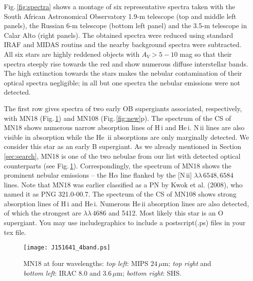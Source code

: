 \documentclass[useAMS]{mn2e}
\begin{document}
Fig.\,\ref{fig:spectra} shows a montage of six representative
spectra taken with the South African Astronomical Observatory 1.9-m
telescope (top and middle left panels), the Russian 6-m telescope
(bottom left panel) and the 3.5-m telescope in Calar Alto (right
panels). The obtained spectra were reduced using standard IRAF and
MIDAS routins and the nearby background spectra were subtracted. All
six stars are highly reddened objects with $A_V > 5-10$ mag so that
their spectra steeply rise towards the red and show numerous diffuse
interstellar bands. The high extinction towards the stars makes the
nebular contamination of their optical spectra negligible; in all
but one spectra the nebular emissions were not detected.

The first row gives spectra of two early OB supergiants associated,
respectively, with MN18 (Fig.\,\ref{fig:J151641(4band)}) and MN108
(Fig.\,\ref{fig:new}p). The spectrum of the CS of MN18 shows
numerous narrow absorption lines of H\,{\sc i} and He\,{\sc i}.
N\,{\sc ii} lines are also visible in absorption while the He\,{\sc
ii} absorptions are only marginally detected. We consider this star
as an early B supergiant. As we already mentioned in
Section\,\ref{sec:search}, MN18 is one of the two nebulae from our
list with detected optical counterparts (see
Fig.\,\ref{fig:J151641(4band)}). Correspondingly, the spectrum of
MN18 shows the prominent nebular emissions -- the H$\alpha$ line
flanked by the [N\,{\sc ii}] $\lambda\lambda \, 6548, 6584$ lines.
Note that MN18 was earlier classified as a PN by Kwok et al. (2008),
who named it as PNG 321.0-00.7. The spectrum of the CS of MN108
shows strong absorption lines of H\,{\sc i} and He\,{\sc i}.
Numerous He\,{\sc ii} absorption lines are also detected, of which
the strongest are $\lambda\lambda \, 4686$ and 5412. Most likely
this star is an O supergiant.
You may use includegraphics to include a {\sc postscript(.ps) files} in your tex file.
%
\begin{figure}
\begin{center}
\texttt{[image: J151641\_4band.ps]}
\end{center}
\caption{MN18 at four wavelengths: {\it top left}: MIPS $24 \,
\mu$m; {\it top right} and {\it bottom left}: IRAC 8.0 and $3.6
\, \mu$m; {\it bottom right}: SHS.}
\label{fig:J151641(4band)}
\end{figure}
%
\end{document}
